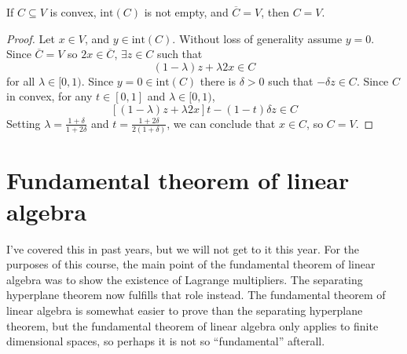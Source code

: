 \begin{lemma}\label{lem:ubiq}
  If $C \subseteq V$ is convex, $\mathrm{int}(C)$ is not empty, and
  $\overline{C} = V$, then $C = V$. 
\end{lemma}
\begin{proof}
  Let $x \in V$, and $y \in \mathrm{int}(C)$.  Without loss of
  generality assume $y = 0$. Since $\overline{C} = V$ so $2x \in \overline{C}$,
  $\exists z \in C$ such that
  \[ (1-\lambda)z + \lambda 2x \in C \]
  for all $\lambda \in [0,1)$. 
  Since $y = 0 \in \mathrm{int}(C)$ there is $\delta>0$ such that 
  $-\delta z \in C$. Since $C$ in convex, for any $t \in [0,1]$ and
  $\lambda \in [0,1)$,
  \[ [(1-\lambda)z + \lambda 2x] t - (1-t) \delta z \in C \]
  Setting $\lambda = \frac{1+\delta}{1+2\delta}$ and $t =
  \frac{1+2\delta}{2(1+\delta)}$, we can conclude that $x \in C$, so
  $C = V$.  
\end{proof}

\section{Fundamental theorem of linear algebra}
I've covered this in past years, but we will not get to it this
year. For the purposes of this course, the main point of the
fundamental theorem of linear algebra was to show the existence of
Lagrange multipliers. The separating hyperplane theorem now fulfills
that role instead. The fundamental theorem of linear algebra is
somewhat easier to prove than the separating hyperplane theorem, but
the fundamental theorem of linear algebra only applies to finite
dimensional spaces, so perhaps it is not so ``fundamental'' afterall. 

